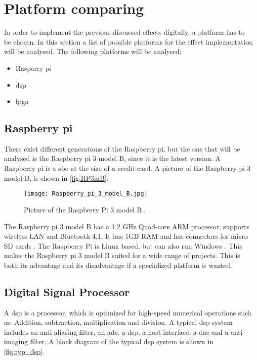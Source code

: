 \section{Platform comparing}
In order to implement the previous discussed effects digitally, a platform has to be chosen. In this section a list of possible platforms for the effect implementation will be analysed. The following platforms will be analysed:

\begin{itemize}
\item Rasperry pi
\item \gls{dsp}
\item \gls{fpga}
\end{itemize}

\subsection{Raspberry pi}
There exist different generations of the Raspberry pi, but the one that will be analysed is the Raspberry pi 3 model B, since it is the latest version. 
A Raspberry pi is a \gls{sbc} at the size of a credit-card. A picture of the Raspberry pi 3 model B, is shown in \autoref{fig:RP3mB}.

\begin{figure}[h]
	\centering
		\texttt{[image: Raspberry\_pi\_3\_model\_B.jpg]}
		\caption{Picture of the Raspberry Pi 3 model B \cite{Raspberry_pi}.}
		\label{fig:RP3mB}
\end{figure}

The Raspberry pi 3 model B has a 1.2 GHz Quad-core ARM processor, supports wireless LAN and Bluetooth 4.1. It has 1GB RAM and has connectors for micro SD cards \cite{Raspberry_pi}.
The Raspberry Pi is Linux based, but can also run Windows \cite{sparkfun_Raspberry_pi}. This makes the Raspberry pi 3 model B suited for a wide range of projects. This is both its advantage and its disadvantage if a specialized platform is wanted. 

\subsection{Digital Signal Processor}
A \gls{dsp} is a processor, which is optimized for high-speed numerical operations such as: Addition, subtraction, multiplication and division. A typical \gls{dsp} system includes an anti-aliasing filter, an \gls{adc}, a \gls{dsp}, a host interface, a \gls{dac} and a anti-imaging filter. A block diagram of the typical \gls{dsp} system is shown in \autoref{fig:typ_dsp}.

